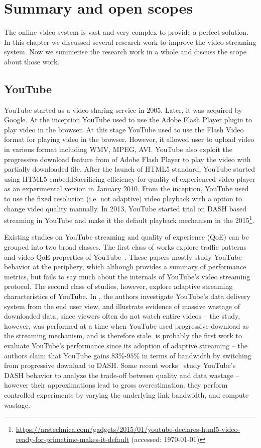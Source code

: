 \section{Summary and open scopes}
The online video system is vast and very complex to provide a perfect solution. In this chapter we discussed several research work to improve the video streaming system. Now we summerise the research work in a whole and discuss the scope about those work.

\subsection{YouTube}
YouTube started as a video sharing service in 2005. Later, it was acquired by Google. At the inception YouTube used to use the Adobe Flash Player plugin to play video in the browser. At this stage YouTube used to use the Flash Video format for playing video in the browser. However, it allowed user to upload video in various format including WMV, MPEG, AVI. YouTube also exploit the progressive download feature from of Adobe Flash Player to play the video with partially downloaded file\cite{gill2007youtube}. After the launch of HTML5 standard, YouTube started using HTML5 embeddSacrificing efficiency for quality of experienced video player as an experimental version in January 2010. From the inception, YouTube used to use the fixed resolution (i.e. not adaptive) video playback with a option to change video quality manually.
In 2013, YouTube started trial on DASH based streaming in YouTube and make it the default playback mechanism in the 2015\footnote{\url{https://arstechnica.com/gadgets/2015/01/youtube-declares-html5-video-ready-for-primetime-makes-it-default} (accessed: \today)}.

Existing studies on YouTube streaming and quality of experience (QoE) can be grouped into two broad classes. The first class of works explore traffic patterns and video QoE properties of YouTube~\cite{gill2007youtube,krishnappa2013dashing,wamser2016modeling,wamser2015poster,6757893ieeeexp,7129790ieeeexp}. These papers mostly study YouTube behavior at the periphery, which although provides a summary of performance metrics, but fails to say much about the internals of YouTube's video streaming protocol. The second class of studies, however, explore adaptive streaming characteristics of YouTube. In \cite{finamore2011youtube}, the authors investigate YouTube's data delivery system from the end user view, and illustrate evidence of massive wastage of downloaded data, since viewers often do not watch entire videos -- the study, however, was performed at a time when YouTube used progressive download as the streaming mechanism, and is therefore stale. \cite{krishnappa2013dashing} is probably the first work to evaluate YouTube's performance since its adoption of adaptive streaming -- the authors claim that YouTube gains $83\%$-$95\%$ in terms of bandwidth by switching from progressive download to DASH. Some recent works~\cite{sieber2015cost,seufert2015youtube,sieber2016sacrificing} study YouTube's DASH behavior to analyze the trade-off between quality and data wastage -- however their approximations lead to gross overestimation. they perform controlled experiments by varying the underlying link bandwidth, and compute wastage.



